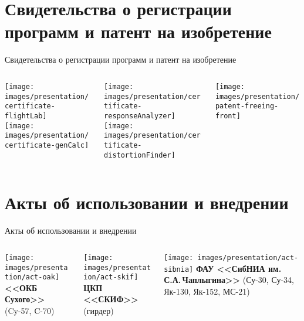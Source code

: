 \section{Свидетельства о регистрации программ и патент на изобретение}

\begin{frame}{Свидетельства о регистрации программ и патент на изобретение}
	\begin{center}
		\begin{columns}
			\begin{column}{0.24\textwidth}
				\centering
				\texttt{[image: images/presentation/certificate-flightLab]} \\ \vspace{0.5em}
				\texttt{[image: images/presentation/certificate-genCalc]}
			\end{column}
			\begin{column}{0.24\textwidth}
				\centering
				\texttt{[image: images/presentation/certificate-responseAnalyzer]} \\ \vspace{0.5em}
				\texttt{[image: images/presentation/certificate-distortionFinder]}
			\end{column}
			\begin{column}{0.3\textwidth}
				\centering
				\texttt{[image: images/presentation/patent-freeing-front]}
			\end{column}
		\end{columns}
	\end{center}
\end{frame}

\section{Акты об использовании и внедрении}

\begin{frame}{Акты об использовании и внедрении}
	\begin{center}
		\begin{columns}
			\begin{column}{0.34\textwidth}
				\centering
				\texttt{[image: images/presentation/act-oak]}
				\textbf{<<ОКБ Сухого>>} \\ (Cy-57, C-70)
			\end{column}
			\begin{column}{0.34\textwidth}
				\centering
				\texttt{[image: images/presentation/act-skif]}
				\textbf{ЦКП <<СКИФ>>} \\ (гирдер)
			\end{column}
			\begin{column}{0.34\textwidth}
				\centering
				\vspace{2.5em}
				\texttt{[image: images/presentation/act-sibnia]}
				\textbf{ФАУ <<СибНИА им.\,С.А.\,Чаплыгина>>} (Су-30, Су-34, Як-130, Як-152, МС-21)
			\end{column}
		\end{columns}
	\end{center}	
\end{frame}
